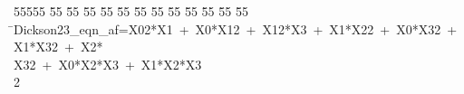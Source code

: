 %
%
\begin{tabbing}
55555 \= 55 \= 55 \= 55 \= 55 \= 55 \= 55 \= 55 \= 55 \= 55 \= 55 \= 55 \= 55 \= \>Dickson23\_eqn\_af=X02*X1\ +\ X0*X12\ +\ X12*X3\ +\ X1*X22\ +\ X0*X32\ +\ X1*X32\ +\ X2*\\[0pt]
\>X32\ +\ X0*X2*X3\ +\ X1*X2*X3\\[0pt]
2\>\end{tabbing}
